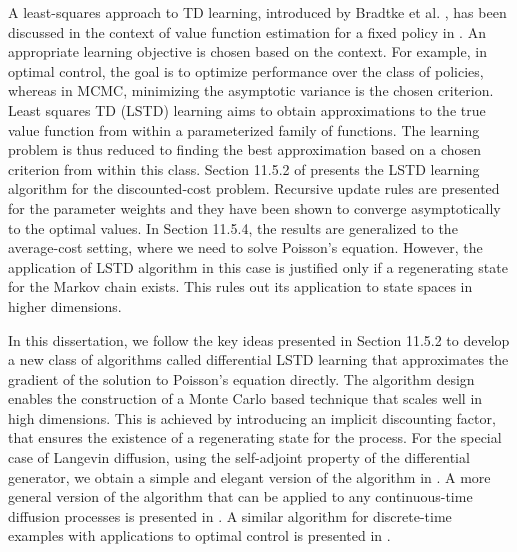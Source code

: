 A least-squares approach to TD learning, introduced by Bradtke et al. \cite{brabar96},  has been discussed in the context of value function estimation for a fixed policy in \cite{ctcn}. An appropriate learning objective is chosen based on the context. For example, in optimal control, the goal is to optimize performance over the class of policies, whereas in MCMC, minimizing the asymptotic variance is the chosen criterion. Least squares TD (LSTD) learning aims to obtain approximations to the true value function from within a parameterized family of functions. The learning problem is thus reduced to finding the best approximation based on a chosen criterion from within this class. Section 11.5.2 of \cite{ctcn} presents the LSTD learning algorithm for the discounted-cost problem. Recursive update rules are presented for the parameter weights and they have been shown to converge asymptotically to the optimal values. In Section 11.5.4, the results are generalized to the average-cost setting, where we need to solve Poisson's equation. However, the application of LSTD algorithm in this case is justified only if a regenerating state for the Markov chain exists. This rules out its application to state spaces in higher dimensions.

In this dissertation, we follow the key ideas presented in Section 11.5.2 to develop a new class of algorithms called differential LSTD learning that approximates the gradient of the solution to Poisson's equation directly.  The algorithm design enables the construction of a Monte Carlo based technique that scales well in high dimensions. This is achieved by introducing an implicit discounting factor, that ensures the existence of a regenerating state for the process. For the special case of Langevin diffusion, using the self-adjoint property of the differential generator, we obtain a simple and elegant version of the algorithm in .  A more general version of the algorithm that can be applied to any continuous-time diffusion processes is presented in . 
A similar algorithm for discrete-time examples with applications to optimal control is presented in \cite{devmey16arXiv}.
 

